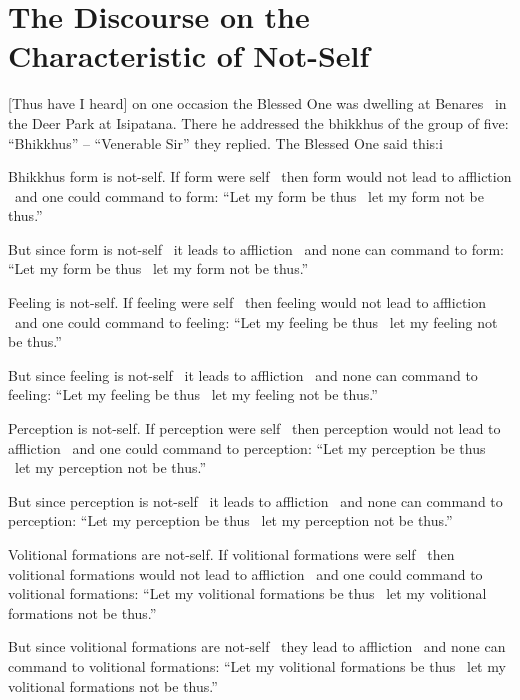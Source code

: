 \section{The Discourse on the Characteristic of Not-Self}
\label{characteristic-of-not-self}

[Thus have I heard] on one occasion the Blessed One was dwelling at Benares \breathmark\ in the Deer Park at Isipatana. There he addressed the bhikkhus of the group of five: “Bhikkhus” – “Venerable Sir” they replied. The Blessed One said this:i

Bhikkhus form is not-self. If form were self \breathmark\ then form would not lead to affliction \breathmark\ and one could command to form: “Let my form be thus \breathmark\ let my form not be thus.”

But since form is not-self \breathmark\ it leads to affliction \breathmark\ and none can command to form: “Let my form be thus \breathmark\ let my form not be thus.”

Feeling is not-self. If feeling were self \breathmark\ then feeling would not lead to affliction \breathmark\ and one could command to feeling: “Let my feeling be thus \breathmark\ let my feeling not be thus.”

But since feeling is not-self \breathmark\ it leads to affliction \breathmark\ and none can command to feeling: “Let my feeling be thus \breathmark\ let my feeling not be thus.”

Perception is not-self. If perception were self \breathmark\ then perception would not lead to affliction \breathmark\ and one could command to perception: “Let my perception be thus \breathmark\ let my perception not be thus.”

But since perception is not-self \breathmark\ it leads to affliction \breathmark\ and none can command to perception: “Let my perception be thus \breathmark\ let my perception not be thus.”

Volitional formations are not-self. If volitional formations were self \breathmark\ then volitional formations would not lead to affliction \breathmark\ and one could command to volitional formations: “Let my volitional formations be thus \breathmark\ let my volitional formations not be thus.”

But since volitional formations are not-self \breathmark\ they lead to affliction \breathmark\ and none can command to volitional formations: “Let my volitional formations be thus \breathmark\ let my volitional formations not be thus.”

